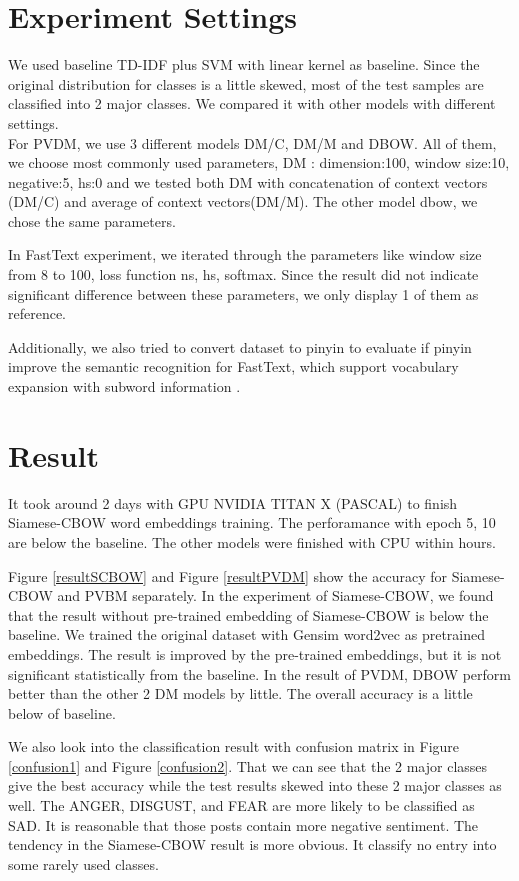 \section{Experiment Settings}


We used baseline TD-IDF plus SVM with linear kernel as baseline. 
Since the original distribution for classes is a little skewed, most of the test samples are classified into 2 major classes.
We compared it with other models with different settings. \\

For PVDM, we use 3 different models DM/C, DM/M and DBOW. All of them, we choose most commonly used parameters, DM : dimension:100, window size:10, negative:5, hs:0 and we tested both DM with concatenation of context vectors (DM/C) and average of context vectors(DM/M). 
The other model dbow, we chose the same parameters.

In FastText experiment, we iterated through the parameters like window size from 8 to 100, 
loss function ns, hs, softmax.  Since the result did not indicate significant difference between these parameters, 
we only display 1 of them as reference.

Additionally, we also tried to convert dataset to pinyin to evaluate if pinyin improve the semantic recognition for FastText, 
which support vocabulary expansion with subword information \cite{bojanowski2016enriching}. 

\section{Result}

It took around 2 days with GPU NVIDIA TITAN X (PASCAL) to finish Siamese-CBOW word embeddings training. The perforamance with epoch 5, 10 are below the baseline. 
The other models were finished with CPU within hours.

Figure \ref{resultSCBOW} and Figure \ref{resultPVDM} show the accuracy for Siamese-CBOW and PVBM separately. 
In the experiment of Siamese-CBOW, we found that the result without pre-trained embedding of Siamese-CBOW is below the baseline. We trained the original dataset with Gensim word2vec as pretrained embeddings.
The result is improved by the pre-trained embeddings, but it is not significant statistically from the baseline. In the result of PVDM, DBOW perform better than the other 2 DM models by little. 
The overall accuracy is a little below of baseline.

We also look into the classification result with confusion matrix in Figure \ref{confusion1} and Figure \ref{confusion2}.
That we can see that the 2 major classes give the best accuracy while the test results skewed into these 2 major classes as well.  
The ANGER, DISGUST, and FEAR are more likely to be classified as SAD. It is reasonable that those posts contain more negative sentiment.
The tendency in the Siamese-CBOW result is more obvious. It classify no entry into some rarely used classes.

